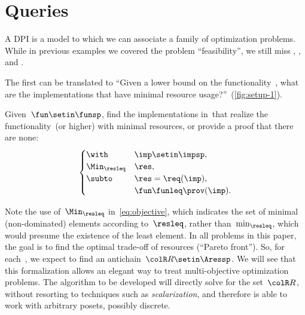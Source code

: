 
\section{Queries}
\label{sec:design-problems-querying}

A DPI is a model to which we can associate a family of optimization problems.
While in previous examples we covered the problem ``feasibility'', we still miss \FixFunMinRes, \FixResMaxFun, and \FeasibleImp.

The first can be translated to ``Given a lower bound on the functionality~\fun, what are the implementations that have minimal resource usage?''~(\cref{fig:setup-1}).

\begin{problem}[\FixFunMinRes]
\label{prob:FixFunMinRes}
Given~$\fun\setin\funsp$, find the implementations in~\impsp that realize the functionality~\fun (or higher) with minimal resources, or provide a proof that there are none:
\begin{equation}
    \label{eq:objective}
    \begin{cases}
        \with          & \imp\setin\impsp,       \\
        \Min_{\resleq} & \res,                   \\
        \subto         & \res=\req(\imp),        \\
                       & \fun\funleq\prov(\imp).
    \end{cases}
\end{equation}
\end{problem}

\begin{figure*}
    \centering
    \caption{}
    \label{fig:setup-1}
\end{figure*}

\begin{remark}
    Note the use of~$\Min_{\resleq}$ in~\cref{eq:objective},
    which indicates the set of minimal (non-dominated) elements according to~$\resleq$, rather than~$\min_{\resleq}$, which would presume the existence of the least element.
    In all problems in this paper, the goal is to find the optimal trade-off of resources (``Pareto front'').
    So, for each~\fun, we expect to find an antichain~${\colR R}\setin\Aressp$.
    We will see that this formalization allows an elegant way to treat multi-objective optimization problems.
    The algorithm to be developed will directly solve for the set~${\colR R}$, without resorting to techniques such as \emph{scalarization}, and therefore is able to work with arbitrary posets, possibly discrete.
\end{remark}

